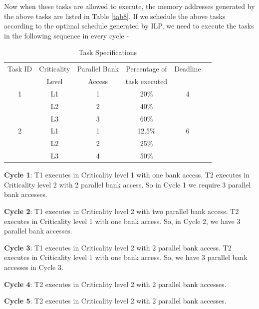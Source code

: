Now when these tasks are allowed to execute, the memory addresses generated by the above tasks are listed in
Table \ref{tab8}. If we schedule the above tasks according to the optimal schedule generated by ILP, we need to execute 
the tasks in the following sequence in every cycle -

\begin{table}[t]
\centering
\begin{tabular}{|c|c|c|c|c|c|}\hline
 Task ID & Criticality & Parallel Bank  & Percentage of & Deadline \\
         & Level & Access  & task executed &  \\ \hline
 1 & L1 & 1 & 20\% & 4 \\ 
   & L2 & 2 & 40\% & \\
   & L3 & 3 & 60\% & \\ \hline
 2 & L1 & 1 & 12.5\% & 6 \\
   & L2 & 2 & 25\% & \\
   & L3 & 4 & 50\% & \\ \hline
\end{tabular} 
\caption{Task Specifications}
\label{tab7}
\end{table}

 
\begin{description}
 \item {\bf Cycle 1}: T1 executes in Criticality level 1 with one bank access. T2 executes in Criticality level 2 with 2 
 parallel bank access. So in Cycle 1 we require 3 parallel bank accesses. 
 \item {\bf Cycle 2}: T1 executes in Criticality level 2 with two parallel bank access. T2 executes in Criticality level 1 
 with one bank access. So, in Cycle 2, we have 3 parallel bank accesses.
 \item {\bf Cycle 3}: T1 executes in Criticality level 2 with 2 parallel bank access. T2 executes in Criticality level 1
 with one bank access. So, we have 3 parallel bank accesses in Cycle 3.
 \item {\bf Cycle 4}: T2 executes in Criticality level 2 with 2 parallel bank accesses.
 \item {\bf Cycle 5}: T2 executes in Criticality level 2 with 2 parallel bank accesses. 
\end{description}



